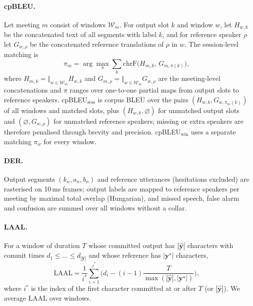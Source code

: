 \paragraph{cpBLEU.} Let meeting $m$ consist of windows $\mathcal{W}_m$. For output slot $k$ and window $w$, let
$H_{w,k}$ be the concatenated text of all segments with label $k$, and for reference speaker $\rho$ let $G_{w,\rho}$ be
the concatenated reference translations of $\rho$ in $w$. The session-level matching is
\begin{equation}
\pi_m=\arg\max_{\pi}\sum_{k}\mathrm{chrF}\big(H_{m,k},\,G_{m,\pi(k)}\big),
\end{equation}
where $H_{m,k}=\Vert_{w\in\mathcal{W}_m}H_{w,k}$ and $G_{m,\rho}=\Vert_{w\in\mathcal{W}_m}G_{w,\rho}$ are the
meeting-level concatenations and $\pi$ ranges over one-to-one partial maps from output slots to reference speakers. cpBLEU$_\text{sess}$ is corpus BLEU over the
pairs $(H_{w,k},G_{w,\pi_m(k)})$ of all windows and matched slots, plus $(H_{w,k},\varnothing)$ for unmatched output
slots and $(\varnothing,G_{w,\rho})$ for unmatched reference speakers; missing or extra speakers are therefore
penalised through brevity and precision. cpBLEU$_\text{win}$ uses a separate matching $\pi_w$ for every window.

\paragraph{DER.} Output segments $(k_n,a_n,b_n)$ and reference utterances (hesitations excluded) are rasterised on
10\,ms frames; output labels are mapped to reference speakers per meeting by maximal total overlap (Hungarian), and
missed speech, false alarm and confusion are summed over all windows without a collar.

\paragraph{LAAL.} For a window of duration $T$ whose committed output has $|\hat{\bm{y}}|$ characters with commit times
$d_1\le\dots\le d_{|\hat{\bm{y}}|}$ and whose reference has $|\bm{y}^\star|$ characters,
\begin{equation}
\mathrm{LAAL}=\frac{1}{i^\ast}\sum_{i=1}^{i^\ast}\Big(d_i-(i-1)\frac{T}{\max(|\hat{\bm{y}}|,|\bm{y}^\star|)}\Big),
\end{equation}
where $i^\ast$ is the index of the first character committed at or after $T$ (or $|\hat{\bm{y}}|$). We average LAAL
over windows.

